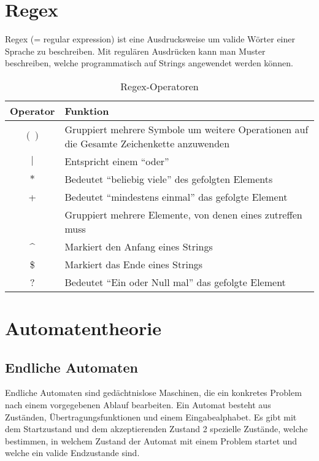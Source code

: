 \documentclass{article}
\begin{document}
\newpage
\section{Regex}
Regex (= regular expression) ist eine Ausdrucksweise um valide Wörter einer Sprache zu beschreiben. Mit regulären Ausdrücken kann man Muster beschreiben, welche programmatisch auf Strings angewendet werden können. 

\begin{table}[h!]
		\begin{center}
				\caption{Regex-Operatoren}
				\label{tab:Regexoperationen}
				\begin{tabular}{|c|p{8cm}|}
						\hline
						\textbf{Operator} & \textbf{Funktion} \\
						\hline
						$()$ & Gruppiert mehrere Symbole um weitere Operationen auf die Gesamte Zeichenkette anzuwenden\\
						\hline
						$|$ & Entspricht einem ``oder''\\
						\hline
						$*$ & Bedeutet ``beliebig viele'' des gefolgten Elements\\
						\hline
						+ & Bedeutet ``mindestens einmal'' das gefolgte Element\\
						\hline
						[ ] & Gruppiert mehrere Elemente, von denen eines zutreffen muss\\
						\hline
						\textasciicircum & Markiert den Anfang eines Strings\\
						\hline
						\$ & Markiert das Ende eines Strings\\
						\hline
						? & Bedeutet ``Ein oder Null mal'' das gefolgte Element\\
						\hline
				\end{tabular}
		\end{center}
\end{table}

\section{Automatentheorie}
\subsection{Endliche Automaten}
Endliche Automaten sind gedächtnislose Maschinen, die ein konkretes Problem nach einem vorgegebenen Ablauf bearbeiten. Ein Automat besteht aus Zuständen, Übertragungsfunktionen und einem Eingabealphabet. Es gibt mit dem Startzustand und dem akzeptierenden Zustand 2 spezielle Zustände, welche bestimmen, in welchem Zustand der Automat mit einem Problem startet und welche ein valide Endzustande sind.
\end{document}
